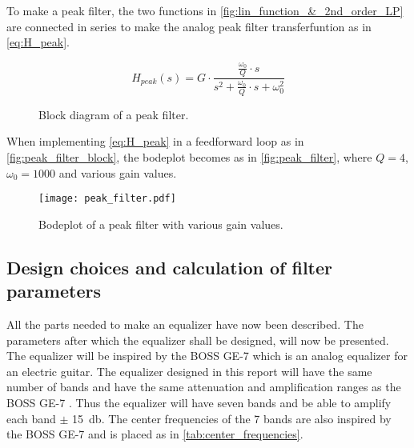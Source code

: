 To make a peak filter, the two functions in \autoref{fig:lin_function_&_2nd_order_LP} are connected in series to make the analog peak filter transferfuntion as in \autoref{eq:H_peak}.

\begin{equation}\label{eq:H_peak}
        H_{peak}(s) = G \cdot \frac{\frac{\omega_0}{Q}\cdot s}{s^2+\frac{\omega_0}{Q}\cdot s + \omega_0^2}
    \end{equation}
    
    \startexplain
    \stopexplain

\begin{figure}[!h]
\centering
\def\svgwidth{\columnwidth}

\caption{Block diagram of a peak filter.}
		\label{fig:peak_filter_block}
\end{figure}

When implementing \autoref{eq:H_peak} in a feedforward loop as in \autoref{fig:peak_filter_block}, the bodeplot becomes as in \autoref{fig:peak_filter}, where $Q = 4$, $\omega_0 = 1000$ and various gain values. 



\begin{figure}[!h]
    \centering
        \texttt{[image: peak\_filter.pdf]}
        \caption{Bodeplot of a peak filter with various gain values.}
        \label{fig:peak_filter}
  \end{figure} 
  
\subsection{Design choices and calculation of filter parameters}
All the parts needed to make an equalizer have now been described. The parameters after which the equalizer shall be designed, will now be presented. 
The equalizer will be inspired by the BOSS GE-7 which is an analog equalizer for an electric guitar. The equalizer designed in this report will have the same number of bands and have the same attenuation and amplification ranges as the BOSS GE-7 \citep{Boss_GE7}. Thus the equalizer will have seven bands and be able to amplify each band $\pm$ \SI{15}{\decibel}.
The center frequencies of the 7 bands are also inspired by the BOSS GE-7 and is placed as in \autoref{tab:center_frequencies}.

